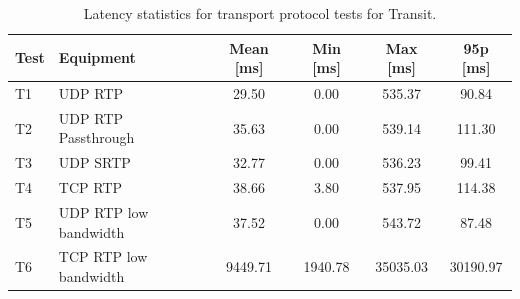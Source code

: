 \begin{table}[H]
    \centering
    \caption{Latency statistics for transport protocol tests for Transit.}\label{tab:transit_transport_latency}
    \begin{tabular}{|l|l|c|c|c|c|}
    \hline
    \textbf{Test} & \textbf{Equipment} & \textbf{Mean [ms]} & \textbf{Min [ms]} & \textbf{Max [ms]} & \textbf{95p [ms]} \\
    \hline
    T1 & UDP RTP & 29.50 & 0.00 & 535.37 & 90.84\\
    \hline
    T2 & UDP RTP Passthrough & 35.63 & 0.00 & 539.14 & 111.30  \\
    \hline
    T3 & UDP SRTP & 32.77 & 0.00 & 536.23 & 99.41 \\
    \hline
    T4 & TCP RTP & 38.66 & 3.80 & 537.95 & 114.38  \\
    \hline
    T5 & UDP RTP low bandwidth & 37.52 & 0.00 & 543.72 & 87.48\\
    \hline
    T6 & TCP RTP low bandwidth & 9449.71 & 1940.78 & 35035.03 & 30190.97 \\
    \hline
    \end{tabular}
\end{table}
